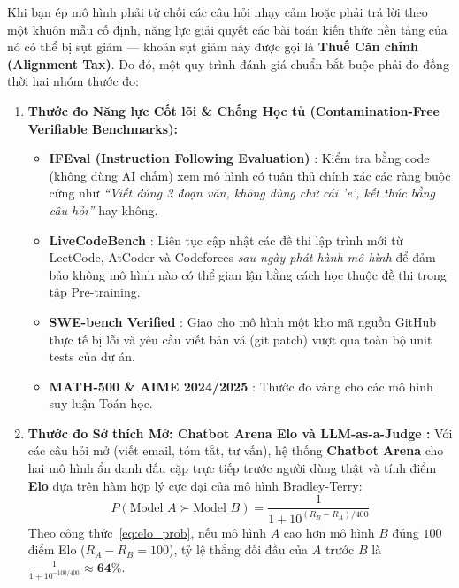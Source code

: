 Khi bạn ép mô hình phải từ chối các câu hỏi nhạy cảm hoặc phải trả lời theo một khuôn mẫu cố định, năng lực giải quyết các bài toán kiến thức nền tảng của nó có thể bị sụt giảm --- khoản sụt giảm này được gọi là \textbf{Thuế Căn chỉnh (Alignment Tax)}. Do đó, một quy trình đánh giá chuẩn bắt buộc phải đo đồng thời hai nhóm thước đo:
\begin{enumerate}
  \item \textbf{Thước đo Năng lực Cốt lõi \& Chống Học tủ (Contamination-Free Verifiable Benchmarks):}
  \begin{itemize}
    \item \textbf{IFEval (Instruction Following Evaluation)} \citep{zhou2023instruction}: Kiểm tra bằng code (không dùng AI chấm) xem mô hình có tuân thủ chính xác các ràng buộc cứng như \textit{``Viết đúng 3 đoạn văn, không dùng chữ cái 'e', kết thúc bằng câu hỏi''} hay không.
    \item \textbf{LiveCodeBench} \citep{jain2024livecodebench}: Liên tục cập nhật các đề thi lập trình mới từ LeetCode, AtCoder và Codeforces \textit{sau ngày phát hành mô hình} để đảm bảo không mô hình nào có thể gian lận bằng cách học thuộc đề thi trong tập Pre-training.
    \item \textbf{SWE-bench Verified} \citep{jimenez2024swebench}: Giao cho mô hình một kho mã nguồn GitHub thực tế bị lỗi và yêu cầu viết bản vá (git patch) vượt qua toàn bộ unit tests của dự án.
    \item \textbf{MATH-500 \& AIME 2024/2025} \citep{hendrycks2021measuring}: Thước đo vàng cho các mô hình suy luận Toán học.
  \end{itemize}
  \item \textbf{Thước đo Sở thích Mở: Chatbot Arena Elo \citep{chiang2024chatbot} và LLM-as-a-Judge \citep{zheng2023judging}:}
  Với các câu hỏi mở (viết email, tóm tắt, tư vấn), hệ thống \textbf{Chatbot Arena} \citep{chiang2024chatbot} cho hai mô hình ẩn danh đấu cặp trực tiếp trước người dùng thật và tính điểm \textbf{Elo} dựa trên hàm hợp lý cực đại của mô hình Bradley-Terry:
  \begin{equation}
    P(\text{Model } A \succ \text{Model } B) = \frac{1}{1 + 10^{(R_B - R_A) / 400}}
    \label{eq:elo_prob}
  \end{equation}
  Theo công thức~\eqref{eq:elo_prob}, nếu mô hình $A$ cao hơn mô hình $B$ đúng $100$ điểm Elo ($R_A - R_B = 100$), tỷ lệ thắng đối đầu của $A$ trước $B$ là $\frac{1}{1 + 10^{-100/400}} \approx \mathbf{64\%}$.
\end{enumerate}

